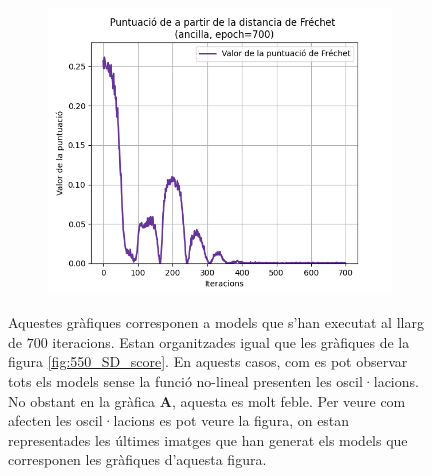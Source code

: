 \begin{figure}[H]
\begin{subfigure}[b]{.32\linewidth}
		\includegraphics[width=\linewidth]{figures/data/FD_score_A6.png}
		\caption{}
	\end{subfigure}
	\caption{Aquestes gràfiques corresponen a models que s'han executat al llarg de $700$ iteracions. Estan organitzades igual que les gràfiques de la figura \ref{fig:550_SD_score}. En aquests casos, com es pot observar tots els models sense la funció no-lineal presenten les oscil·lacions. No obstant en la gràfica \textbf{A}, aquesta es molt feble. Per veure com afecten les oscil·lacions es pot veure la figura, on estan representades les últimes imatges que han generat els models que corresponen les gràfiques d'aquesta figura.}
	\label{fig:700_SD_score}
\end{figure}

